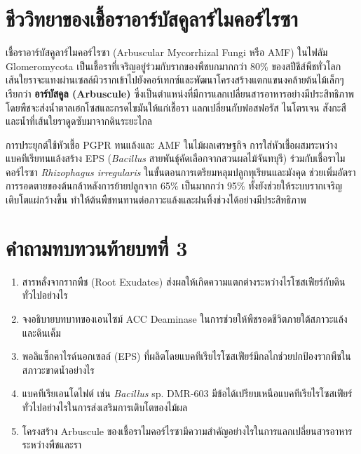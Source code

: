 \section{ชีววิทยาของเชื้อราอาร์บัสคูลาร์ไมคอร์ไรซา}

เชื้อราอาร์บัสคูลาร์ไมคอร์ไรซา (Arbuscular Mycorrhizal Fungi หรือ AMF) ในไฟลัม Glomeromycota เป็นเชื้อราที่เจริญอยู่ร่วมกับรากของพืชบกมากกว่า 80\% ของสปีชีส์พืชทั่วโลก เส้นใยราจะแทงผ่านเซลล์ผิวรากเข้าไปยังคอร์เทกซ์และพัฒนาโครงสร้างแตกแขนงคล้ายต้นไม้เล็กๆ เรียกว่า \textbf{อาร์บัสคูล (Arbuscule)} ซึ่งเป็นตำแหน่งที่มีการแลกเปลี่ยนสารอาหารอย่างมีประสิทธิภาพ โดยพืชจะส่งน้ำตาลเฮกโซสและกรดไขมันให้แก่เชื้อรา แลกเปลี่ยนกับฟอสฟอรัส ไนโตรเจน สังกะสี และน้ำที่เส้นใยราดูดซับมาจากดินระยะไกล

\begin{agribox}{การประยุกต์ใช้หัวเชื้อ PGPR ทนแล้งและ AMF ในไม้ผลเศรษฐกิจ}
การใส่หัวเชื้อผสมระหว่างแบคทีเรียทนแล้งสร้าง EPS (\textit{Bacillus} สายพันธุ์คัดเลือกจากสวนผลไม้จันทบุรี) ร่วมกับเชื้อราไมคอร์ไรซา \textit{Rhizophagus irregularis} ในขั้นตอนการเตรียมหลุมปลูกทุเรียนและมังคุด ช่วยเพิ่มอัตราการรอดตายของต้นกล้าหลังการย้ายปลูกจาก 65\% เป็นมากกว่า 95\% ทั้งยังช่วยให้ระบบรากเจริญเติบโตแผ่กว้างขึ้น ทำให้ต้นพืชทนทานต่อภาวะแล้งและฝนทิ้งช่วงได้อย่างมีประสิทธิภาพ
\end{agribox}

\section*{คำถามทบทวนท้ายบทที่ 3}
\begin{enumerate}
    \item สารหลั่งจากรากพืช (Root Exudates) ส่งผลให้เกิดความแตกต่างระหว่างไรโซสเฟียร์กับดินทั่วไปอย่างไร
    \item จงอธิบายบทบาทของเอนไซม์ ACC Deaminase ในการช่วยให้พืชรอดชีวิตภายใต้สภาวะแล้งและดินเค็ม
    \item พอลิแซ็กคาไรด์นอกเซลล์ (EPS) ที่ผลิตโดยแบคทีเรียไรโซสเฟียร์มีกลไกช่วยปกป้องรากพืชในสภาวะขาดน้ำอย่างไร
    \item แบคทีเรียเอนโดไฟต์ เช่น \textit{Bacillus} sp. DMR-603 มีข้อได้เปรียบเหนือแบคทีเรียไรโซสเฟียร์ทั่วไปอย่างไรในการส่งเสริมการเติบโตของไม้ผล
    \item โครงสร้าง Arbuscule ของเชื้อราไมคอร์ไรซามีความสำคัญอย่างไรในการแลกเปลี่ยนสารอาหารระหว่างพืชและรา
\end{enumerate}

\clearpage